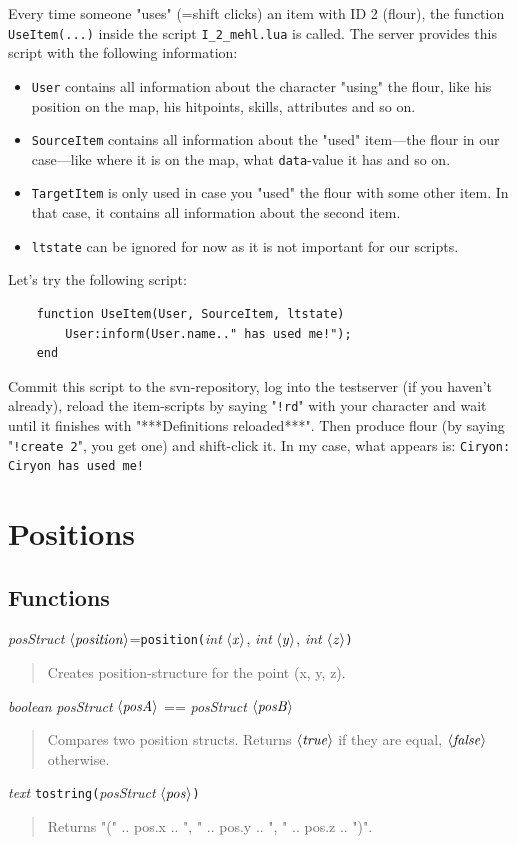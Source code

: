 \documentclass[a4paper,10pt,makeidx]{scrreprt}
\newcommand{\com}[2]{\index{#1}\texttt{#1(}#2\texttt{)}}
\newcommand{\var}[1]{$\left\langle \text{\emph{#1}} \right\rangle$}
\newcommand{\integer}{\textsl{int }}
\newcommand{\txt}{\textsl{text }}
\newcommand{\bool}{\textsl{boolean }}
\newcommand{\position}{\textsl{posStruct }}
\begin{document}
Every time someone "uses" (=shift clicks) an item with ID 2 (flour), the function {\tt UseItem(...)} inside the script {\tt I\_2\_mehl.lua} is called. The server provides this script with the following information:
\begin{itemize}
    \item {\tt User} contains all information about the character "using" the flour, like his position on the map, his hitpoints, skills, attributes and so on.
    \item {\tt SourceItem} contains all information about the "used" item---the flour in our case---like where it is on the map, what {\tt data}-value it has and so on.
    \item {\tt TargetItem} is only used in case you "used" the flour with some other item. In that case, it contains all information about the second item.
    \item {\tt ltstate} can be ignored for now as it is not important for our scripts.
\end{itemize}
Let's try the following script:
\begin{verbatim}
    function UseItem(User, SourceItem, ltstate)
        User:inform(User.name.." has used me!");
    end
\end{verbatim}
Commit this script to the svn-repository, log into the testserver (if you haven't already), reload the item-scripts by saying "{\tt !rd}" with your character and wait until it finishes with "***Definitions reloaded***". Then produce flour (by saying "{\tt !create 2}", you get one) and shift-click it. In my case, what appears is: {\tt Ciryon: Ciryon has used me!}

\chapter{Positions}

\section{Functions}
\position \var{position}=\com{position}{\integer \var{x}, \integer \var{y}, \integer \var{z}}
\begin{quote}
Creates position-structure for the point (x, y, z).\\
\end{quote}
\bool \position \var{posA} == \position \var{posB}
\begin{quote}
Compares two position structs. Returns \var{true} if they are equal, \var{false} otherwise.
\end{quote}
\txt \com{tostring}{\position \var{pos}}
\begin{quote}
Returns "(" .. pos.x .. ", " .. pos.y .. ", " .. pos.z .. ")".
\end{quote}
\end{document}

